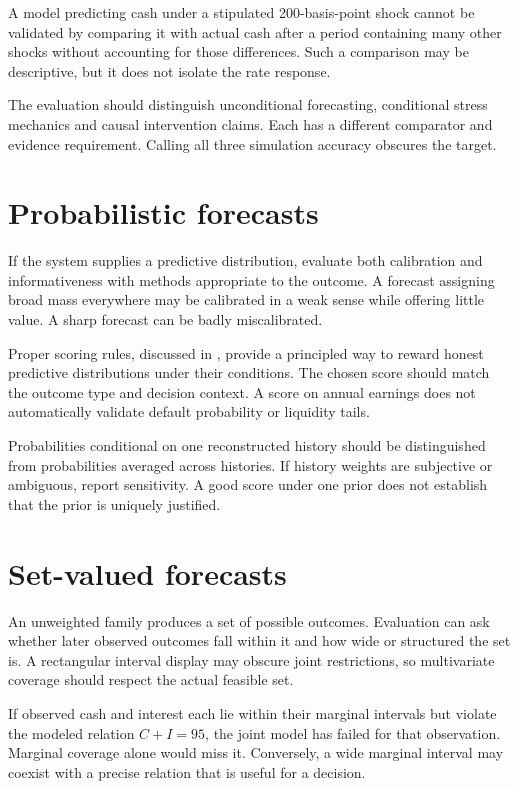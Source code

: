 A model predicting cash under a stipulated 200-basis-point shock cannot be validated by comparing it with actual cash after a period containing many other shocks without accounting for those differences. Such a comparison may be descriptive, but it does not isolate the rate response.

The evaluation should distinguish unconditional forecasting, conditional stress mechanics and causal intervention claims. Each has a different comparator and evidence requirement. Calling all three simulation accuracy obscures the target.

\section{Probabilistic forecasts}
If the system supplies a predictive distribution, evaluate both calibration and informativeness with methods appropriate to the outcome. A forecast assigning broad mass everywhere may be calibrated in a weak sense while offering little value. A sharp forecast can be badly miscalibrated.

Proper scoring rules, discussed in \citet{gneiting2007proper}, provide a principled way to reward honest predictive distributions under their conditions. The chosen score should match the outcome type and decision context. A score on annual earnings does not automatically validate default probability or liquidity tails.

Probabilities conditional on one reconstructed history should be distinguished from probabilities averaged across histories. If history weights are subjective or ambiguous, report sensitivity. A good score under one prior does not establish that the prior is uniquely justified.

\section{Set-valued forecasts}
An unweighted family produces a set of possible outcomes. Evaluation can ask whether later observed outcomes fall within it and how wide or structured the set is. A rectangular interval display may obscure joint restrictions, so multivariate coverage should respect the actual feasible set.

If observed cash and interest each lie within their marginal intervals but violate the modeled relation $C+I=95$, the joint model has failed for that observation. Marginal coverage alone would miss it. Conversely, a wide marginal interval may coexist with a precise relation that is useful for a decision.

